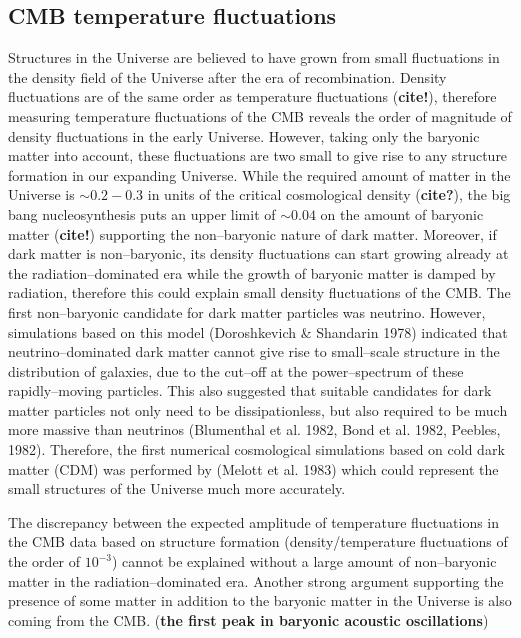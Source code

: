 \documentclass[paper=a4, fontsize=11pt]{scrartcl} %
\numberwithin{equation}{section} %
\numberwithin{figure}{section} %
\numberwithin{table}{section} %
\newcommand{\ignore}[1]{}
\begin{document}
\subsection{CMB temperature fluctuations}
\ignore{One very convincing evidence for the presence and amount of DM in our Universe is from the fluctuations of the CMB. Quote the cosmological density fractions for DM, baryon, and the Hubble constant for the latest Planck paper.}
Structures in the Universe are believed to have grown from small fluctuations in the density field of the Universe after the era of recombination. Density fluctuations are of the same order as temperature fluctuations ({\bf cite!})\ignore{\bf why? look back in the structure formation part!}, therefore measuring temperature fluctuations of the CMB reveals the order of magnitude of density fluctuations in the early Universe. However, taking only the baryonic matter into account, these fluctuations are two small to give rise to any structure formation in our expanding Universe. While the required amount of matter in the Universe is $\sim 0.2 - 0.3$ in units of the critical cosmological density ({\bf cite?}), the big bang nucleosynthesis puts an upper limit of $\sim 0.04$ on the amount of baryonic matter ({\bf cite!}) supporting the non--baryonic nature of dark matter. Moreover, if dark matter is non--baryonic, its density fluctuations can start growing already at the radiation--dominated era while the growth of baryonic matter is damped by radiation, therefore this could explain small density fluctuations of the CMB.
The first non--baryonic candidate for dark matter particles was neutrino. However, simulations based on this model (Doroshkevich \& Shandarin 1978) indicated that neutrino--dominated dark matter cannot give rise to small--scale structure in the distribution of galaxies, due to the cut--off at the power--spectrum of these rapidly--moving particles. This also suggested that suitable candidates for dark matter particles not only need to be dissipationless, but also required to be much more massive than neutrinos (Blumenthal et al. 1982, Bond et al. 1982, Peebles, 1982). Therefore, the first numerical cosmological simulations based on cold dark matter (CDM) was performed by (Melott et al. 1983) which could represent the small structures of the Universe much more accurately.

The discrepancy between the expected amplitude of temperature fluctuations in the CMB data based on structure formation (density/temperature fluctuations of the order of $10^{-3}$) cannot be explained without a large amount of non--baryonic matter in the radiation--dominated era. Another strong argument supporting the presence of some matter in addition to the baryonic matter in the Universe is also coming from the CMB. ({\bf the first peak in baryonic acoustic oscillations})
\end{document}
